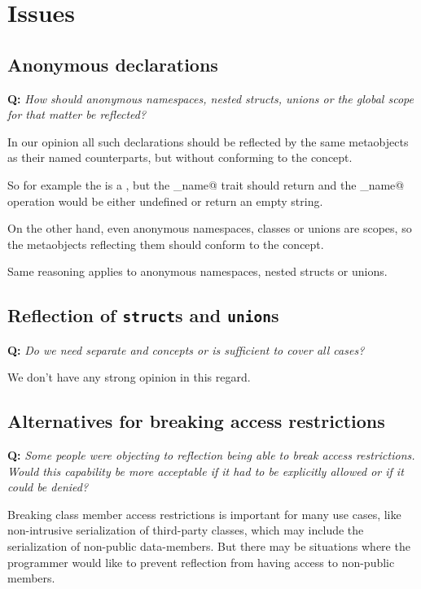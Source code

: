 \section{Issues}

\subsection{Anonymous declarations}

\textbf{Q:} {\em How should anonymous namespaces, nested structs, unions or
the global scope for that matter be reflected?}

In our opinion all such declarations should be reflected by
the same metaobjects as their named counterparts, but without conforming
to the  concept.

So for example the  is a , but
the \verb@has_name@ trait should return \verb@false@ and the \verb@get_name@
operation would be either undefined or return an empty string.

On the other hand, even anonymous namespaces, classes or unions are scopes,
so the metaobjects reflecting them should conform to the  concept.

Same reasoning applies to anonymous namespaces, nested structs or unions.

\subsection{Reflection of \texttt{struct}s and \texttt{union}s}

\textbf{Q:} {\em Do we need separate  and 
concepts or is  sufficient to cover all cases?}

We don't have any strong opinion in this regard.

\subsection{Alternatives for breaking access restrictions}
\label{issue-breaking-access}

\textbf{Q:} {\em Some people were objecting to reflection being able to break
access restrictions. Would this capability be more acceptable if it had to be
explicitly allowed or if it could be denied?}

Breaking class member access restrictions is important for many use cases,
like non-intrusive serialization of third-party classes, which may include
the serialization of non-public data-members.
But there may be situations where the programmer would like to prevent
reflection from having access to non-public members.

